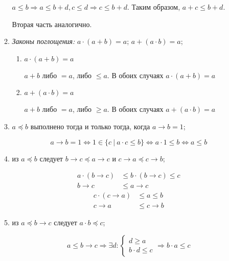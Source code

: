 \begin{enumerate}
\begin{enumerate}
                    \(a \leq b \Rightarrow a \leq b + d, c \leq d \Rightarrow c \leq b + d\). Таким образом, \(a + c \leq b + d\).

                    Вторая часть аналогично.

              \item \emph{Законы поглощения:} $a \cdot (a + b) = a$; $a + (a \cdot b) = a$;

                    \begin{enumerate}
                        \item \(a\cdot (a + b) = a\)

                              \(a + b\) либо \( = a\), либо \( \leq a\). В обоих случаях \(a\cdot (a + b) = a\)

                        \item \(a + (a \cdot b) = a\)

                              \(a + b\) либо \( = a\), либо \( \geq a\). В обоих случаях \(a + (a \cdot b) = a\)
                    \end{enumerate}

              \item $a \preceq b$ выполнено тогда и только тогда, когда $a \rightarrow b = 1$;

                    \[a \to b = 1 \Leftrightarrow 1 \in \{c\ |\ a\cdot c \leq b\} \Leftrightarrow a\cdot 1 \leq b \Leftrightarrow a \leq b\]

              \item из $a \preceq b$ следует $b\rightarrow c \preceq a\rightarrow c$ и $c\rightarrow a \preceq c \rightarrow b$;

                    \begin{align*}
                        a \cdot (b \to c) & \leq b \cdot (b \to c) \leq c \\
                        b \to c           & \leq a \to c
                    \end{align*}
                    \begin{align*}
                        c \cdot (c \to a) & \leq a \leq b \\
                        c \to a           & \leq c \to b
                    \end{align*}

              \item из $a \preceq b \rightarrow c$ следует $a \cdot b \preceq c$;

                    \[a \leq b \to c \Rightarrow \exists d : \begin{cases}
                            d \geq a \\
                            b\cdot d \leq c
                        \end{cases} \Rightarrow b\cdot a \leq c\]


\end{enumerate}
\end{enumerate}
